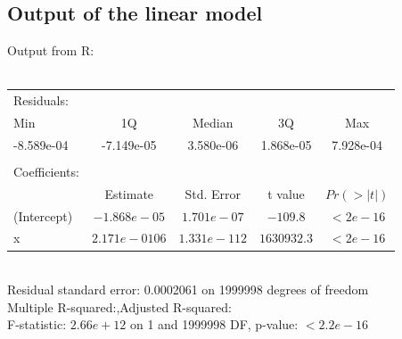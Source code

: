 \documentclass[a4paper, 12pt, envcountsect, runningheads]{llncs}
\numberwithin{figure}{section}
\numberwithin{equation}{section}
\begin{document}
\subsection{Output of the linear model}\label{A:diagrams}
Output from R:\\\\
\begin{tabular}{lcccc}
Residuals:&&&&\\
Min & 1Q & Median & 3Q & Max\\ 
-8.589e-04 & -7.149e-05 & 3.580e-06 & 1.868e-05 & 7.928e-04 \\
&&&&\\
Coefficients:&&&&\\
					& Estimate & Std. Error & t value & $Pr(>|t|)$    \\
(Intercept) & $-1.868e-05$ &  $1.701e-07$  &  $-109.8$ & $< 2e-16$\\
x          &  $2.171e-0106$ & $1.331e-112$ & $1630932.3$ & $< 2e-16$\\
\end{tabular} \\
Residual standard error: 0.0002061 on 1999998 degrees of freedom\\
Multiple R-squared:,\quad Adjusted R-squared: \\
F-statistic: $2.66e+12$ on 1 and 1999998 DF,  p-value: $< 2.2e-16$
\end{document}
